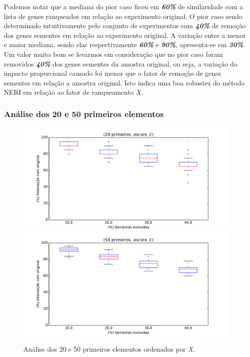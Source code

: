 Podemos notar que a mediana do pior caso ficou em \textbf{\textsl{60\%}} de similaridade com a lista de genes ranqueados em relação ao experimento original. O pior caso sendo determinado intuitivamente pelo conjunto de experimentos com  \textbf{\textsl{40\%}} de remoção dos genes sementes em relação ao experimento original. A variação entre a menor e maior mediana, sendo elas respectivamente \textbf{\textsl{60\%}} e \textbf{\textsl{90\%}}, apresenta-se em \textbf{\textsl{30\%}}. Um valor muito bom se levarmos em consideração que no pior caso foram removidos \textbf{\textsl{40\%}} dos genes sementes da amostra original, ou seja, a variação do impacto proporcional causado foi menor que o fator de remoção de genes sementes em relação a amostra original. Isto indica uma boa robustez do método NERI em relação ao fator de ranqueamento $X$.  

\subsubsection{Análise dos 20 e 50 primeiros elementos}
%
\begin{figure}[ht!]
\includegraphics[width=1\textwidth]{Images/analyses/fig_X_20_40.pdf}
\includegraphics[width=1\textwidth]{Images/analyses/fig_X_50_40.pdf}
\caption {Análise dos 20 e 50 primeiros elementos ordenados por \textit{X}.
\label{fig_X_20-50_40}}
\end{figure}
%

